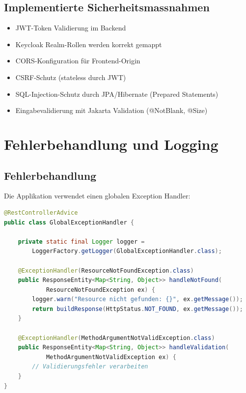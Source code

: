 \documentclass[a4paper,12pt,twoside]{report}
\begin{document}
\subsection{Implementierte Sicherheitsmassnahmen}
\begin{itemize}
    \item JWT-Token Validierung im Backend
    \item Keycloak Realm-Rollen werden korrekt gemappt
    \item CORS-Konfiguration für Frontend-Origin
    \item CSRF-Schutz (stateless durch JWT)
    \item SQL-Injection-Schutz durch JPA/Hibernate (Prepared Statements)
    \item Eingabevalidierung mit Jakarta Validation (@NotBlank, @Size)
\end{itemize}

\newpage

\section{Fehlerbehandlung und Logging}

\subsection{Fehlerbehandlung}
Die Applikation verwendet einen globalen Exception Handler:

\begin{lstlisting}[language=java, caption=GlobalExceptionHandler.java (Auszug)]
@RestControllerAdvice
public class GlobalExceptionHandler {

    private static final Logger logger = 
        LoggerFactory.getLogger(GlobalExceptionHandler.class);

    @ExceptionHandler(ResourceNotFoundException.class)
    public ResponseEntity<Map<String, Object>> handleNotFound(
            ResourceNotFoundException ex) {
        logger.warn("Resource nicht gefunden: {}", ex.getMessage());
        return buildResponse(HttpStatus.NOT_FOUND, ex.getMessage());
    }

    @ExceptionHandler(MethodArgumentNotValidException.class)
    public ResponseEntity<Map<String, Object>> handleValidation(
            MethodArgumentNotValidException ex) {
        // Validierungsfehler verarbeiten
    }
}
\end{lstlisting}
\end{document}
